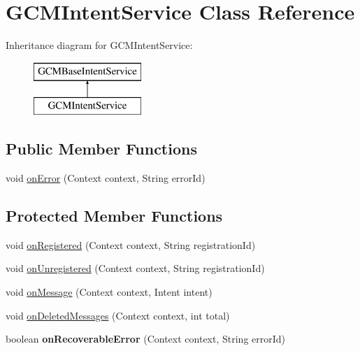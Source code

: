 \hypertarget{classapp_1_1utilities_1_1_g_c_m_intent_service}{\section{G\-C\-M\-Intent\-Service Class Reference}
\label{classapp_1_1utilities_1_1_g_c_m_intent_service}
}
Inheritance diagram for G\-C\-M\-Intent\-Service\-:\begin{figure}[H]
\begin{center}
\leavevmode
\includegraphics[height=2.000000cm]{classapp_1_1utilities_1_1_g_c_m_intent_service}
\end{center}
\end{figure}
\subsection*{Public Member Functions}
\begin{DoxyCompactItemize}
\item 
void \hyperlink{classapp_1_1utilities_1_1_g_c_m_intent_service_ae37637d7c0d211ad2eabedbe9fd1868d}{on\-Error} (Context context, String error\-Id)
\end{DoxyCompactItemize}
\subsection*{Protected Member Functions}
\begin{DoxyCompactItemize}
\item 
void \hyperlink{classapp_1_1utilities_1_1_g_c_m_intent_service_a728b0ab7da9ddde56987bd076805cd82}{on\-Registered} (Context context, String registration\-Id)
\item 
void \hyperlink{classapp_1_1utilities_1_1_g_c_m_intent_service_a1895cf62d624c24fbc1ff2eaeef76064}{on\-Unregistered} (Context context, String registration\-Id)
\item 
void \hyperlink{classapp_1_1utilities_1_1_g_c_m_intent_service_a0e3f670228c7669e83881949ce01a5b1}{on\-Message} (Context context, Intent intent)
\item 
void \hyperlink{classapp_1_1utilities_1_1_g_c_m_intent_service_a5a09fc23e1e041a0cdd718ef858e971d}{on\-Deleted\-Messages} (Context context, int total)
\item 
\hypertarget{classapp_1_1utilities_1_1_g_c_m_intent_service_afb513b7107b20cc9a40bcb9b31a9ecca}{boolean {\bfseries on\-Recoverable\-Error} (Context context, String error\-Id)}\label{classapp_1_1utilities_1_1_g_c_m_intent_service_afb513b7107b20cc9a40bcb9b31a9ecca}

\end{DoxyCompactItemize}


